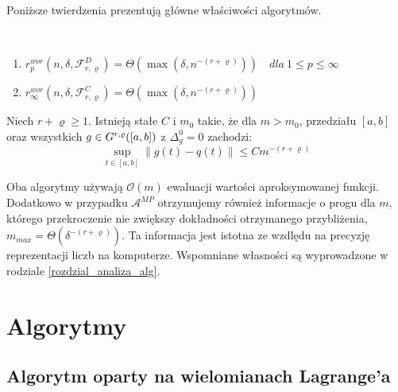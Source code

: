\documentclass[oik, pdftex, robocza, man]{mgrwms}
\begin{document}
    Poniższe twierdzenia prezentują główne właściwości algorytmów.
    
    \begin{thm} \label{AoP_tw1} ~%
        \begin{enumerate}
            \item $r^{wor}_{p}(n, \delta, \mathcal{F}^{D}_{r,\varrho}) = \Theta(\max(\delta, n^{-(r+\varrho)})) \quad dla \: 1 \leq p \leq \infty$
            \item $r^{wor}_{\infty}(n, \delta, \mathcal{F}^{C}_{r,\varrho}) = \Theta(\max(\delta, n^{-(r+\varrho)}))$
        \end{enumerate}
    \end{thm}

    \begin{thm}
        \label{2014_tw1}
        Niech $r+\varrho \geq 1$. Istnieją stałe $C$ i $m_{0}$ takie, że dla $m>m_{0}$, przedziału $[a,b]$ oraz wszystkich $g \in G^{r,\varrho}([a,b])$ z $\Delta_{g}^{0} = 0$ zachodzi:
        \begin{equation*}
            \sup_{t \in [a,b]} \| g(t) - q(t) \| \leq Cm^{-(r+\varrho)}
        \end{equation*}        
    \end{thm}
    \vspace{10pt}
    
    \begin{uw}
        Oba algorytmy używają $\mathcal{O}(m)$ ewaluacji wartości aproksymowanej funkcji. Dodatkowo w przypadku $\mathcal{A}^{MP}$ otrzymujemy również informacje o progu dla $m$, którego przekroczenie nie zwiększy dokładności otrzymanego przybliżenia, $m_{max} = \varTheta(\delta^{-(r+\varrho)})$. Ta informacja jest istotna ze wzdlędu na precyzję reprezentacji liczb na komputerze. Wspomniane własności są wyprowadzone w rodziale \ref{rozdzial_analiza_alg}.    
    \end{uw}
    \vspace{10pt}

    
\mgrclosechapter


\chapter{Algorytmy}


\section{Algorytm oparty na wielomianach Lagrange'a}
\end{document}
